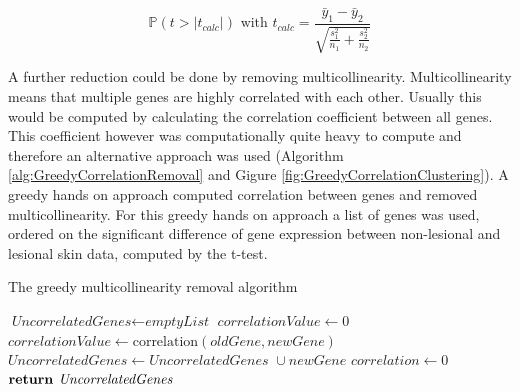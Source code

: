 \documentclass[10pt,a4paper]{report}
\begin{document}
	\begin{equation}
	\label{eq:UnequalVarianceTTest}
	\mathbb{P}(t >|t_{calc}|) \text { with } t_{calc} = \frac{\bar{y}_1 - 
		\bar{y}_2}{\sqrt{\frac{s^2_1}{n_1} + \frac{s^2_2}{n_2}}} 
	\end{equation}
	
	A further reduction could be done by removing multicollinearity. Multicollinearity means that multiple genes are highly correlated with each other. Usually this would be computed by calculating the correlation coefficient between all genes. This coefficient however was computationally quite heavy to compute and therefore an alternative approach was used (Algorithm \ref{alg:GreedyCorrelationRemoval} and Gigure \ref{fig:GreedyCorrelationClustering}). A greedy hands on approach computed correlation between genes and removed multicollinearity. For this greedy hands on approach a list of genes was used, ordered on the significant difference of gene expression between non-lesional and lesional skin data, computed by the t-test.
	
	\begin{algorithm}[H]
		\caption{The greedy multicollinearity removal algorithm}\label{alg:GreedyCorrelationRemoval}
		\begin{algorithmic}[1]
			\State $\textit{UncorrelatedGenes} \gets \textit{emptyList}$
			\State $\textit{correlationValue} \gets 0$
			\State $\textit{correlationValue} \gets \text{correlation}(\textit{oldGene}, newGene)$
			\EndIf
			\EndFor
			\State $\textit{UncorrelatedGenes} \gets \textit{UncorrelatedGenes } \cup newGene$
			\EndIf
			\State $\textit{correlation} \gets 0$
			\EndFor
			\State $\textbf{return } \emph{UncorrelatedGenes}$
			\EndProcedure
		\end{algorithmic}
	\end{algorithm}
	
\end{document}
